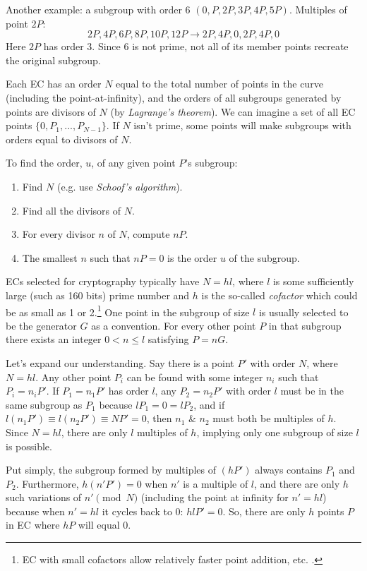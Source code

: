 Another example: a subgroup with order 6 $(0, P, 2P, 3P, 4P, 5P)$. Multiples of point $2P$:\vspace{.175cm}
\[2P, 4P, 6P, 8P, 10P, 12P \rightarrow 2P, 4P, 0, 2P, 4P, 0\]
Here $2P$ has order 3. Since 6 is not prime, not all of its member points recreate the original subgroup.

Each EC has an order $N$ equal to the total number of points in the curve (including the point-at-infinity), and the orders of all subgroups generated by points are divisors of $N$ (by {\em Lagrange’s theorem}). We can imagine a set of all EC points $\{0,P_1,...,P_{N-1}\}$. If $N$ isn't prime, some points will make subgroups with orders equal to divisors of $N$.

To find the order, $u$, of any given point $P$'s subgroup:
\begin{enumerate}
    \item Find $N$ (e.g. use {\em Schoof's algorithm}).
    \item Find all the divisors of $N$.
    \item For every divisor $n$ of $N$, compute $n P$.
    \item The smallest $n$ such that $n P = 0$ is the order $u$ of the subgroup.
\end{enumerate} 

ECs selected for cryptography typically have $N = hl$, where $l$ is some sufficiently large (such as 160 bits) prime number and $h$ is the so-called {\em cofactor} which could be as small as 1 or 2.\footnote{EC with small cofactors allow relatively faster point addition, etc. \cite{Bernstein2008}.} One point in the subgroup of size $l$ is usually selected to be the generator $G$ as a convention. For every other point $P$ in that subgroup there exists an integer $0 < n \leq l$ satisfying $P = n G$.

Let's expand our understanding. Say there is a point $P'$ with order $N$, where $N=h l$. Any other point $P_i$ can be found with some integer $n_i$ such that $P_i=n_i P'$. If $P_1=n_1 P'$ has order $l$, any $P_2=n_2 P'$ with order $l$ must be in the same subgroup as $P_1$ because $l P_1=0 = l P_2$, and if $l(n_1 P') \equiv l(n_2 P') \equiv N P'=0$, then $n_1$ \& $n_2$ must both be multiples of $h$. Since $N= h l$, there are only $l$ multiples of $h$, implying only one subgroup of size $l$ is possible.

Put simply, the subgroup formed by multiples of $(h P')$ always contains $P_1$ and $P_2$. Furthermore, $h(n' P')=0$ when $n'$ is a multiple of $l$, and there are only $h$ such variations of $n' \pmod N$ (including the point at infinity for $n' = hl$) because when $n' = h l$ it cycles back to 0: $h l P' = 0$. So, there are only $h$ points $P$ in EC where $h P$ will equal 0.

